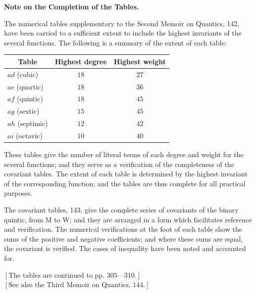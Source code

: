 \documentclass[11pt,a4paper]{article}
\begin{document}
\clearpage
\setcounter{page}{302}

\begin{center}
\textbf{Note on the Completion of the Tables.}
\end{center}

The numerical tables supplementary to the Second Memoir on Quantics, 142, have been carried to a sufficient extent to include the highest invariants of the several functions. The following is a summary of the extent of each table:

\begin{center}
\begin{tabular}{|l|c|c|}
\hline
\multicolumn{1}{|c|}{Table} & Highest degree & Highest weight \\
\hline
$ad$ (cubic) & $18$ & $27$ \\
$ae$ (quartic) & $18$ & $36$ \\
$af$ (quintic) & $18$ & $45$ \\
$ag$ (sextic) & $15$ & $45$ \\
$ah$ (septimic) & $12$ & $42$ \\
$ai$ (octavic) & $10$ & $40$ \\
\hline
\end{tabular}
\end{center}

These tables give the number of literal terms of each degree and weight for the several functions; and they serve as a verification of the completeness of the covariant tables. The extent of each table is determined by the highest invariant of the corresponding function; and the tables are thus complete for all practical purposes.

The covariant tables, 143, give the complete series of covariants of the binary quintic, from M to W; and they are arranged in a form which facilitates reference and verification. The numerical verifications at the foot of each table show the sums of the positive and negative coefficients; and where these sums are equal, the covariant is verified. The cases of inequality have been noted and accounted for.

\vspace{2ex}
\hfill $[\text{The tables are continued to pp.\ }305\text{---}310.]$ \\
\hfill $[\text{See also the Third Memoir on Quantics, }144.]$ 



\end{document}

